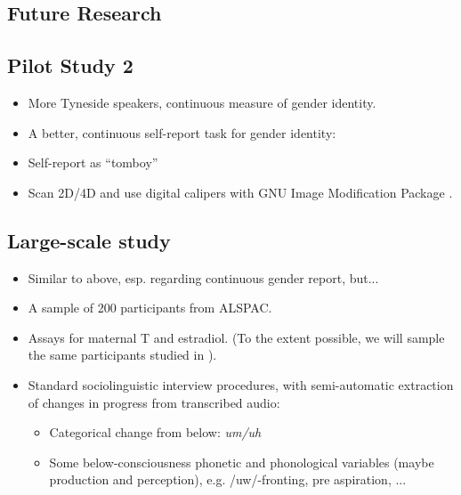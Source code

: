 \documentclass[a0,portrait]{a0poster}
\begin{document}
\begin{multicols}{2}
\section*{Future Research}

\subsection{Pilot Study 2}
\begin{itemize}
\item More Tyneside speakers, continuous measure of gender identity.
\item A better, continuous self-report task for gender identity:
\end{itemize}
\begin{itemize}
\item Self-report as ``tomboy''
\item Scan 2D/4D and use digital calipers with GNU Image Modification Package \citep[][]{allawayetal2009}.
\end{itemize}

\subsection{Large-scale study}


\begin{itemize}
	\item Similar to above, esp. regarding continuous gender report, but...
	\item A sample of 200 participants from ALSPAC.
	\item Assays for maternal T and estradiol. (To the extent possible, we will sample the same participants studied in \citealt{hinesetal2002}). 
	\item Standard sociolinguistic interview procedures, with semi-automatic extraction of changes in progress from transcribed audio:
	\begin{itemize}
		\item Categorical change from below: \textsl{um/uh}
		\item Some below-consciousness phonetic and phonological variables (maybe production and perception), e.g. /uw/-fronting, pre aspiration, ...
	\end{itemize}
\end{itemize}



\end{multicols}
\end{document}
